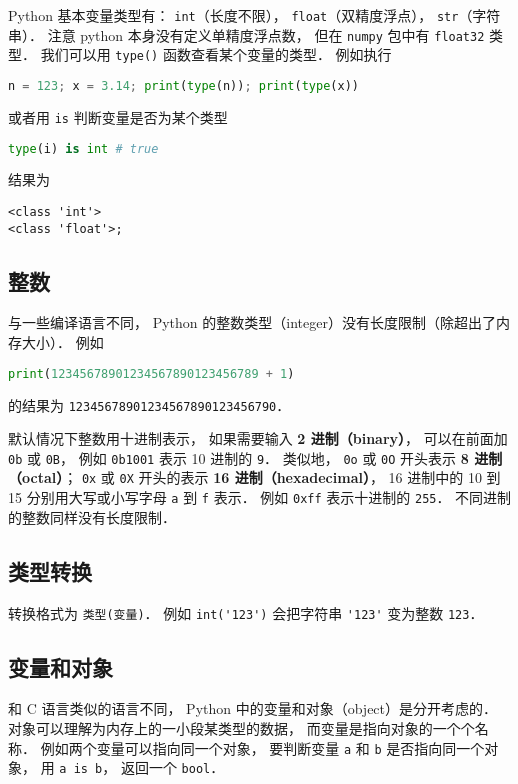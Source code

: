 
\begin{issues}
\issueDraft
\end{issues}

Python 基本变量类型有： \verb|int|（长度不限）， \verb|float|（双精度浮点）， \verb|str|（字符串）． 注意 python 本身没有定义单精度浮点数， 但在 \verb|numpy| 包中有 \verb|float32| 类型． 我们可以用 \verb|type()| 函数查看某个变量的类型． 例如执行
\begin{lstlisting}[language=python]
n = 123; x = 3.14; print(type(n)); print(type(x))
\end{lstlisting}
或者用 \verb|is| 判断变量是否为某个类型
\begin{lstlisting}[language=python]
type(i) is int # true
\end{lstlisting}
结果为
\begin{lstlisting}
<class 'int'>
<class 'float'>;
\end{lstlisting}

\subsection{整数}
与一些编译语言不同， Python 的整数类型（integer）没有长度限制（除超出了内存大小）． 例如
\begin{lstlisting}[language=python]
print(12345678901234567890123456789 + 1)
\end{lstlisting}
的结果为 \verb|12345678901234567890123456790|．

默认情况下整数用十进制表示， 如果需要输入 \textbf{2 进制（binary）}， 可以在前面加 \verb|0b| 或 \verb|0B|， 例如 \verb|0b1001| 表示 10 进制的 \verb|9|． 类似地， \verb|0o| 或 \verb|0O| 开头表示 \textbf{8 进制（octal）}； \verb|0x| 或 \verb|0X| 开头的表示 \textbf{16 进制（hexadecimal）}， 16 进制中的 10 到 15 分别用大写或小写字母 \verb|a| 到 \verb|f| 表示． 例如 \verb|0xff| 表示十进制的 \verb|255|． 不同进制的整数同样没有长度限制．

\subsection{类型转换}
转换格式为 \verb|类型(变量)|． 例如 \verb|int('123')| 会把字符串 \verb|'123'| 变为整数 \verb|123|．

\subsection{变量和对象}
和 C 语言类似的语言不同， Python 中的变量和对象（object）是分开考虑的． 对象可以理解为内存上的一小段某类型的数据， 而变量是指向对象的一个个名称． 例如两个变量可以指向同一个对象， 要判断变量 \verb|a| 和 \verb|b| 是否指向同一个对象， 用 \verb|a is b|， 返回一个 \verb|bool|．
